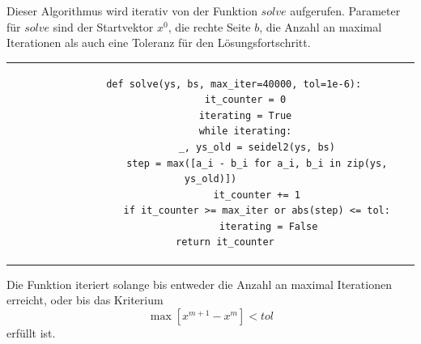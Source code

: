 \documentclass[12pt,titlepage]{article}
\begin{document}
		Dieser Algorithmus wird iterativ von der Funktion $solve$ aufgerufen. Parameter für $solve$ sind der Startvektor
		$x^0$, die rechte Seite $b$, die Anzahl an maximal Iterationen als auch eine Toleranz für den Lösungsfortschritt.
		\newline \newline
		\begin{tabular}{c}
		\begin{lstlisting}
		def solve(ys, bs, max_iter=40000, tol=1e-6):
    		it_counter = 0
    		iterating = True
   	 		while iterating:
        		_, ys_old = seidel2(ys, bs)
        		step = max([a_i - b_i for a_i, b_i in zip(ys, ys_old)])
        		it_counter += 1
        		if it_counter >= max_iter or abs(step) <= tol:
            		iterating = False
    		return it_counter		
	 	\end{lstlisting}
		\end{tabular}
		\newline \newline
		Die Funktion iteriert solange bis entweder die Anzahl an maximal Iterationen erreicht, oder bis das Kriterium
		\begin{equation*}
			\max [x^{m+1}-x^{m}] < tol
		\end{equation*}
		erfüllt ist.
		
\end{document}
